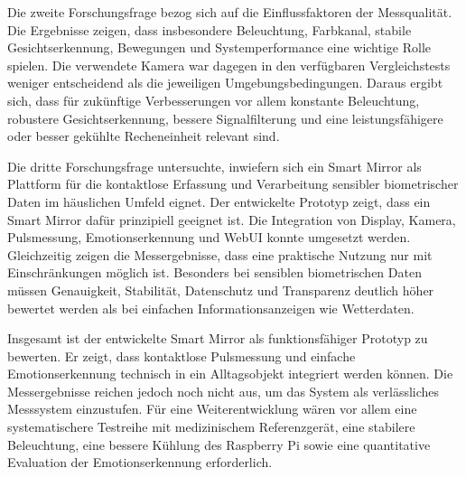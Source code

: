 Die zweite Forschungsfrage bezog sich auf die Einflussfaktoren der Messqualität. Die Ergebnisse zeigen, dass insbesondere Beleuchtung, Farbkanal, stabile Gesichtserkennung, Bewegungen und Systemperformance eine wichtige Rolle spielen. Die verwendete Kamera war dagegen in den verfügbaren Vergleichstests weniger entscheidend als die jeweiligen Umgebungsbedingungen. Daraus ergibt sich, dass für zukünftige Verbesserungen vor allem konstante Beleuchtung, robustere Gesichtserkennung, bessere Signalfilterung und eine leistungsfähigere oder besser gekühlte Recheneinheit relevant sind.

Die dritte Forschungsfrage untersuchte, inwiefern sich ein Smart Mirror als Plattform für die kontaktlose Erfassung und Verarbeitung sensibler biometrischer Daten im häuslichen Umfeld eignet. Der entwickelte Prototyp zeigt, dass ein Smart Mirror dafür prinzipiell geeignet ist. Die Integration von Display, Kamera, Pulsmessung, Emotionserkennung und WebUI konnte umgesetzt werden. Gleichzeitig zeigen die Messergebnisse, dass eine praktische Nutzung nur mit Einschränkungen möglich ist. Besonders bei sensiblen biometrischen Daten müssen Genauigkeit, Stabilität, Datenschutz und Transparenz deutlich höher bewertet werden als bei einfachen Informationsanzeigen wie Wetterdaten.

Insgesamt ist der entwickelte Smart Mirror als funktionsfähiger Prototyp zu bewerten. Er zeigt, dass kontaktlose Pulsmessung und einfache Emotionserkennung technisch in ein Alltagsobjekt integriert werden können. Die Messergebnisse reichen jedoch noch nicht aus, um das System als verlässliches Messsystem einzustufen. Für eine Weiterentwicklung wären vor allem eine systematischere Testreihe mit medizinischem Referenzgerät, eine stabilere Beleuchtung, eine bessere Kühlung des Raspberry Pi sowie eine quantitative Evaluation der Emotionserkennung erforderlich.


